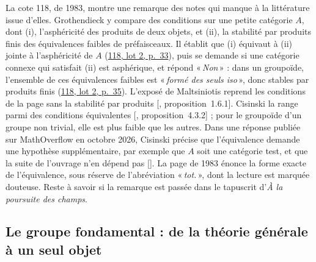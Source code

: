 \documentclass[11pt]{amsart}
\makeatletter
\newcommand{\q}[1]{«\,\textit{#1}\,»}
\def\RHM@first#1--#2\@nil{#1}
\DeclareRobustCommand{\lot}[3]{\begingroup\edef\RHM@pdfpage{\the\numexpr\RHM@first#3--\@nil+1\relax}\href{https://grothendieck.umontpellier.fr/#1.pdf\#page=\RHM@pdfpage}{#1, lot #2, p.~#3}\endgroup}
\newcommand{\lot}[3]{\href{https://grothendieck.commutator.io/\##1/#2/p#3}{#1, lot #2, p.~#3}}
\newcommand{\moanswer}{\citealp{cisinski2026mo}}
\makeatother
\begin{document}
La cote 118, de 1983, montre une remarque des notes qui manque à la littérature issue d'elles. Grothendieck y compare des conditions sur une petite catégorie $A$, dont (i), l'asphéricité des produits de deux objets, et (ii), la stabilité par produits finis des équivalences faibles de préfaisceaux. Il établit que (i) équivaut à (ii) jointe à l'asphéricité de $A$ (\lot{118}{2}{33}), puis se demande si une catégorie connexe qui satisfait (ii) est asphérique, et répond \q{Non} : dans un groupoïde, l'ensemble de ces équivalences faibles est \q{formé des seuls iso}, donc stables par produits finis (\lot{118}{2}{35}). L'exposé de Maltsiniotis reprend les conditions de la page sans la stabilité par produits [\citealp{maltsiniotis2005}, proposition~1.6.1]. Cisinski la range parmi des conditions équivalentes [\citealp{cisinski2006}, proposition~4.3.2] ; pour le groupoïde d'un groupe non trivial, elle est plus faible que les autres. Dans une réponse publiée sur MathOverflow en octobre 2026, Cisinski précise que l'équivalence demande une hypothèse supplémentaire, par exemple que $A$ soit une catégorie test, et que la suite de l'ouvrage n'en dépend pas [\moanswer]. La page de 1983 énonce la forme exacte de l'équivalence, sous réserve de l'abréviation \q{tot.}, dont la lecture est marquée douteuse. Reste à savoir si la remarque est passée dans le tapuscrit d'\emph{À la poursuite des champs}.

\subsection{Le groupe fondamental : de la théorie générale à un seul objet}\label{sub:groupefond}
\end{document}
